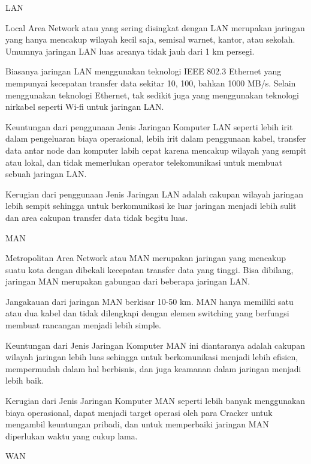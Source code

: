 \documentclass[a4paper,12pt]{report}
\begin{document}
\noindent 
\begin{myEnumerate}
\item LAN \par
Local Area Network atau yang sering disingkat dengan LAN merupakan jaringan yang hanya mencakup wilayah kecil saja, semisal warnet, kantor, atau sekolah. Umumnya jaringan LAN luas areanya tidak jauh dari 1 km persegi. \par
\vspace{12pt}
Biasanya jaringan LAN menggunakan teknologi IEEE 802.3 Ethernet yang mempunyai kecepatan transfer data sekitar 10, 100, bahkan 1000 MB/s. Selain menggunakan teknologi Ethernet, tak sedikit juga yang menggunakan teknologi nirkabel seperti Wi-fi untuk jaringan LAN. \par
\vspace{12pt}
Keuntungan dari penggunaan Jenis Jaringan Komputer LAN seperti lebih irit dalam pengeluaran biaya operasional, lebih irit dalam penggunaan kabel, transfer data antar node dan komputer labih cepat karena mencakup wilayah yang sempit atau lokal, dan tidak memerlukan operator telekomunikasi untuk membuat sebuah jaringan LAN. \par
Kerugian dari penggunaan Jenis Jaringan LAN adalah cakupan wilayah jaringan lebih sempit sehingga untuk berkomunikasi ke luar jaringan menjadi lebih sulit dan area cakupan transfer data tidak begitu luas. \par
\vspace{12pt}
\noindent 
\item MAN \par
Metropolitan Area Network atau MAN merupakan jaringan yang mencakup suatu kota dengan dibekali kecepatan transfer data yang tinggi. Bisa dibilang, jaringan MAN merupakan gabungan dari beberapa jaringan LAN. \par
\vspace{12pt}
Jangakauan dari jaringan MAN berkisar 10-50 km. MAN hanya memiliki satu atau dua kabel dan tidak dilengkapi dengan elemen switching yang berfungsi membuat rancangan menjadi lebih simple. \par
\vspace{12pt}
Keuntungan dari Jenis Jaringan Komputer MAN ini diantaranya adalah cakupan wilayah jaringan lebih luas sehingga untuk berkomunikasi menjadi lebih efisien, mempermudah dalam hal berbisnis, dan juga keamanan dalam jaringan menjadi lebih baik. \par
\vspace{12pt}
Kerugian dari Jenis Jaringan Komputer MAN seperti lebih banyak menggunakan biaya operasional, dapat menjadi target operasi oleh para Cracker untuk mengambil keuntungan pribadi, dan untuk memperbaiki jaringan MAN diperlukan waktu yang cukup lama. \par
\vspace{12pt}
\noindent 
\item WAN\end{myEnumerate}
\end{document}
